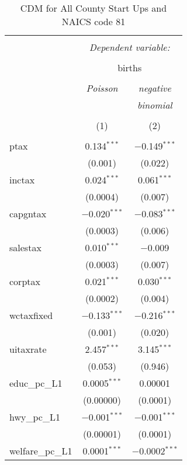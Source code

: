 
\begin{table}[!htbp] \centering 
  \caption{CDM for All County Start Ups and NAICS code 81} 
  \label{} 
\begin{tabular}{@{\extracolsep{5pt}}lcc} 
\\[-1.8ex]\hline 
\hline \\[-1.8ex] 
 & \multicolumn{2}{c}{\textit{Dependent variable:}} \\ 
\cline{2-3} 
\\[-1.8ex] & \multicolumn{2}{c}{births} \\ 
\\[-1.8ex] & \textit{Poisson} & \textit{negative} \\ 
 & \textit{} & \textit{binomial} \\ 
\\[-1.8ex] & (1) & (2)\\ 
\hline \\[-1.8ex] 
 ptax & 0.134$^{***}$ & $-$0.149$^{***}$ \\ 
  & (0.001) & (0.022) \\ 
  inctax & 0.024$^{***}$ & 0.061$^{***}$ \\ 
  & (0.0004) & (0.007) \\ 
  capgntax & $-$0.020$^{***}$ & $-$0.083$^{***}$ \\ 
  & (0.0003) & (0.006) \\ 
  salestax & 0.010$^{***}$ & $-$0.009 \\ 
  & (0.0003) & (0.007) \\ 
  corptax & 0.021$^{***}$ & 0.030$^{***}$ \\ 
  & (0.0002) & (0.004) \\ 
  wctaxfixed & $-$0.133$^{***}$ & $-$0.216$^{***}$ \\ 
  & (0.001) & (0.020) \\ 
  uitaxrate & 2.457$^{***}$ & 3.145$^{***}$ \\ 
  & (0.053) & (0.946) \\ 
  educ\_pc\_L1 & 0.0005$^{***}$ & 0.00001 \\ 
  & (0.00000) & (0.0001) \\ 
  hwy\_pc\_L1 & $-$0.001$^{***}$ & $-$0.001$^{***}$ \\ 
  & (0.00001) & (0.0001) \\ 
  welfare\_pc\_L1 & 0.0001$^{***}$ & $-$0.0002$^{***}$ \\ 

\end{tabular}
\end{table}

